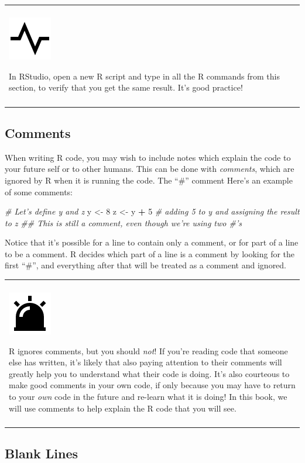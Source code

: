 \documentclass[
]{book}
\newenvironment{Shaded}{\begin{snugshade}}{\end{snugshade}}
\newcommand{\CommentTok}[1]{\textcolor[rgb]{0.56,0.35,0.01}{\textit{#1}}}
\newcommand{\DecValTok}[1]{\textcolor[rgb]{0.00,0.00,0.81}{#1}}
\newcommand{\NormalTok}[1]{#1}
\newcommand{\OperatorTok}[1]{\textcolor[rgb]{0.81,0.36,0.00}{\textbf{#1}}}
\newcommand{\StringTok}[1]{\textcolor[rgb]{0.31,0.60,0.02}{#1}}
\newenvironment{progress}
{
  \begin{center}
  \begin{tabular}{|>{\columncolor{progress}}p{0.9\textwidth}|}
  \hline\\
  \includegraphics[scale=0.1]{src/images/pulse-line.png}
}
{\\\\\hline
  \end{tabular}
  \end{center}
}
\newenvironment{caution}
{
  \begin{center}
  \begin{tabular}{|>{\columncolor{caution}}p{0.9\textwidth}|}
  \hline\\
  \includegraphics[scale=0.1]{src/images/alarm-warning-fill.png}
}
{\\\\\hline
  \end{tabular}
  \end{center}
}
\begin{document}
\begin{progress}
In RStudio, open a new R script and type in all the R commands from this
section, to verify that you get the same result. It's good practice!
\end{progress}

\hypertarget{comments}{%
\subsection{Comments}\label{comments}}

When writing R code, you may wish to include notes which explain the code to your future self or to other humans.
This can be done with \emph{comments}, which are ignored by R when it is running the code.
The ``\#'' comment
Here's an example of some comments:

\begin{Shaded}
\begin{Highlighting}[]
\CommentTok{# Let's define y and z}
\NormalTok{y <-}\StringTok{ }\DecValTok{8}
\NormalTok{z <-}\StringTok{ }\NormalTok{y }\OperatorTok{+}\StringTok{ }\DecValTok{5} \CommentTok{# adding 5 to y and assigning the result to z}
\CommentTok{## This is still a comment, even though we're using two #'s}
\end{Highlighting}
\end{Shaded}

Notice that it's possible for a line to contain only a comment, or for part of a line to be a comment.
R decides which part of a line is a comment by looking for the first ``\#'', and everything after that will be treated as a comment and ignored.

\begin{caution}
R ignores comments, but you should \emph{not}! If you're reading code
that someone else has written, it's likely that also paying attention to
their comments will greatly help you to understand what their code is
doing. It's also courteous to make good comments in your own code, if
only because you may have to return to your \emph{own} code in the
future and re-learn what it is doing! In this book, we will use comments
to help explain the R code that you will see.
\end{caution}

\hypertarget{blank-lines}{%
\subsection{Blank Lines}\label{blank-lines}}
\end{document}
